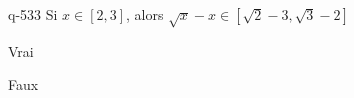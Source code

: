 \begin{truefalse}{q-533}
Si $x\in[2,3]$, alors $\sqrt x-x\in[\sqrt 2-3,\sqrt 3 -2]$
\item* Vrai
\item Faux
\end{truefalse}

